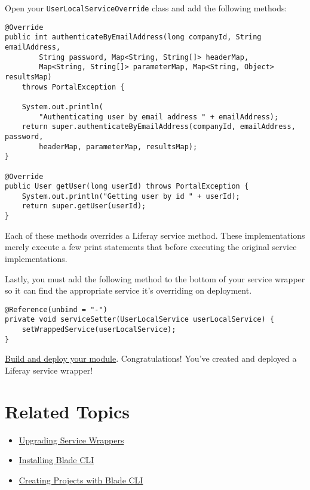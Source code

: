 Open your \texttt{UserLocalServiceOverride} class and add the following
methods:

\begin{verbatim}
@Override
public int authenticateByEmailAddress(long companyId, String emailAddress,
        String password, Map<String, String[]> headerMap,
        Map<String, String[]> parameterMap, Map<String, Object> resultsMap)
    throws PortalException {

    System.out.println(
        "Authenticating user by email address " + emailAddress);
    return super.authenticateByEmailAddress(companyId, emailAddress, password,
        headerMap, parameterMap, resultsMap);
}

@Override
public User getUser(long userId) throws PortalException {
    System.out.println("Getting user by id " + userId);
    return super.getUser(userId);
}
\end{verbatim}

Each of these methods overrides a Liferay service method. These
implementations merely execute a few print statements that before
executing the original service implementations.

Lastly, you must add the following method to the bottom of your service
wrapper so it can find the appropriate service it's overriding on
deployment.

\begin{verbatim}
@Reference(unbind = "-")
private void serviceSetter(UserLocalService userLocalService) {
    setWrappedService(userLocalService);
}
\end{verbatim}

\href{/docs/7-2/reference/-/knowledge_base/r/deploying-a-project}{Build
and deploy your module}. Congratulations! You've created and deployed a
Liferay service wrapper!

\section{Related Topics}\label{related-topics-27}

\begin{itemize}
\tightlist
\item
  \href{/docs/7-2/tutorials/-/knowledge_base/t/upgrading-service-wrapper-hooks}{Upgrading
  Service Wrappers}
\item
  \href{/docs/7-2/reference/-/knowledge_base/r/installing-blade-cli}{Installing
  Blade CLI}
\item
  \href{/docs/7-1/tutorials/-/knowledge_base/t/creating-projects-with-blade-cli}{Creating
  Projects with Blade CLI}
\end{itemize}

